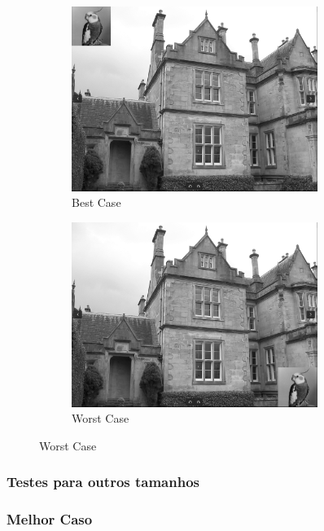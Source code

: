 \documentclass{report}
\begin{document}
\begin{figure}[h]

\begin{subfigure}{0.5\textwidth}
\includegraphics[width=0.9\linewidth, height=6cm]{Screenshot from 2023-11-23 03-27-09.png} 
\caption{Best Case}
\end{subfigure}
\begin{subfigure}{0.5\textwidth}
\includegraphics[width=0.9\linewidth, height=6cm]{Screenshot from 2023-11-23 03-26-59.png}
\caption{Worst Case}
\end{subfigure}
\end{figure}

\vspace{-10mm}

\subsubsection{Testes para outros tamanhos}

\subsubsection{Melhor Caso}
\end{document}
